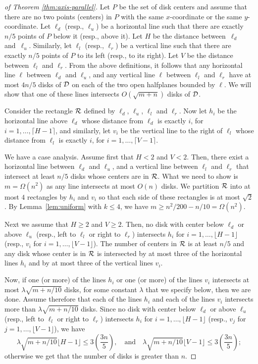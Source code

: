 \documentclass{llncs}
\begin{document}
\begin{proof}[of Theorem \ref{thm:axis-parallel}]
Let $P$ be the set of disk centers and assume that there are no two points (centers) in $P$ with the same $x$-coordinate or the same $y$-coordinate. Let $\ell_d$ (resp., $\ell_u$) be a horizontal line such that there are exactly $n/5$ points of $P$ below it (resp., above it).
Let $H$ be the distance between~$\ell_d$ and~$\ell_u$.
Similarly, let $\ell_l$ (resp., $\ell_r$) be a vertical line such that there are exactly $n/5$ points of $P$ to its left (resp., to its right).
Let $V$ be the distance between $\ell_l$ and $\ell_r$. 
{From} the above definitions, it follows that any horizontal line $\ell$ between $\ell_d$ and $\ell_u$, and any vertical line $\ell$ between $\ell_l$ and $\ell_r$ have at most $4n/5$ disks of $\cal{D}$ on each of the two open halfplanes bounded by $\ell$. We will show that one of these lines intersects $O(\sqrt{m+n})$ disks of $\cal{D}$.

Consider the rectangle $\cal{R}$ defined by $\ell_d$, $\ell_u$, $\ell_l$ and $\ell_r$.
Now let $h_i$ be the horizontal line above $\ell_d$ whose distance from $\ell_d$ is exactly $i$, for $i=1,\ldots,\lceil H-1\rceil$, and similarly,
let $v_i$ be the vertical line to the right of $\ell_l$ whose distance from $\ell_l$ is exactly $i$, for $i=1,\ldots,\lceil V-1 \rceil$.

We have a case analysis.
Assume first that $H < 2$ and $V<2$.
Then, there exist a horizontal line between $\ell_d$ and $\ell_u$, and a vertical line between $\ell_l$ and $\ell_r$ that intersect at least $n/5$ disks whose centers are in $\cal{R}$. What we need to show is $m=\Omega(n^2)$ as any line intersects at most $O(n)$ disks. We partition $\cal{R}$ into at most $4$ rectangles by $h_i$ and $v_i$ so that each side of these rectangles is at most $\sqrt{2}$. By Lemma~\ref{lem:uniform} with $k \leq 4$, we have $m \geq n^2/200 - n/10 = \Omega(n^2)$.

Next we assume that $H \geq 2$ and $V \geq 2$.
Then, no disk with center below $\ell_d$ or above $\ell_u$ (resp., left to $\ell_l$ or right to $\ell_r$) intersects $h_i$ for $i=1, \ldots, \lfloor H-1 \rfloor$ (resp., $v_i$ for $i=1, \ldots, \lfloor V-1 \rfloor$).  The number of centers in $\cal{R}$ is at least $n/5$ and any disk whose center is in $\cal{R}$ is intersected by 
at most three of the horizontal lines $h_i$ and by 
at most three of the vertical lines $v_i$.

Now, if one (or more) of the lines $h_i$ or one (or more) of the lines $v_i$ intersects at most $\lambda \sqrt{m+n/10}$ disks, for some constant $\lambda$ that we specify below, then we are done.
Assume therefore that each of the lines $h_i$ and each of the lines $v_i$ intersects more than $\lambda \sqrt{m+n/10}$ disks.
Since no disk with center below $\ell_d$ or above $\ell_u$ (resp., left to $\ell_l$ or right to $\ell_r$) intersects $h_i$ for $i=1, \ldots, \lfloor H-1 \rfloor$ (resp., $v_j$ for $j=1, \ldots, \lfloor V-1 \rfloor$), 
we have 
\[
\lambda \sqrt{m+n/10} \lfloor H-1 \rfloor  \leq 3\left(\frac{3n}{5}\right), 
\quad
\text{and}
\quad
\lambda \sqrt{m+n/10} \lfloor V-1 \rfloor  \leq 3\left(\frac{3n}{5}\right);
\]
otherwise we get that the number of disks is greater than $n$. 


\end{proof}
\end{document}
